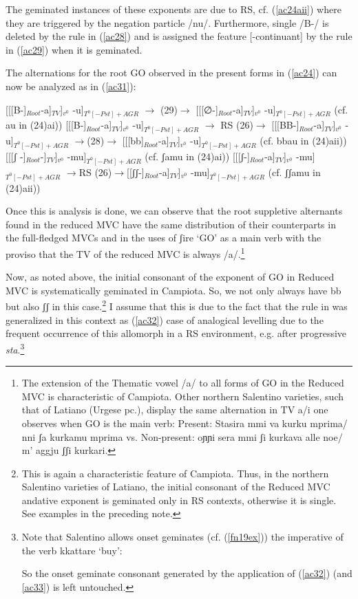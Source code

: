 \documentclass[output=paper]{langscibook}
\begin{document}
The geminated instances of these exponents are due to RS, cf. (\ref{ac24aii}) where they are triggered by the negation particle /nu/. Furthermore, single /B-/ is deleted by the rule in (\ref{ac28}) and is assigned the feature [-continuant] by the rule in (\ref{ac29}) when it is geminated.

The alternations for the root GO observed in the present forms in (\ref{ac24}) can now be analyzed as in (\ref{ac31}):

\ea\label{ac31}
    \ea \label{ac31a}{[[[B-]}$_{Root}$-a]$_{TV}$]$_{v^0}$ -u]$_{T^0 [-Pst]+AGR}$ $\rightarrow$ (29)$\rightarrow$ [[[∅-]$_{Root}$-a]$_{TV}$]$_{v^0}$ -u]$_{T^0 [-Pst]+AGR}$        (cf. au in (24)ai))
    \ex \label{ac31b}{[[[B-]}$_{Root}$-a]$_{TV}$]$_{v^0}$ -u]$_{T^0 [-Pst]+AGR}$ $\rightarrow$ RS (26)$\rightarrow$ [[[BB-]$_{Root}$-a]$_{TV}$]$_{v^0}$ -u]$_{T^0 [-Pst]+AGR}$      $\rightarrow$(28)$\rightarrow$ [[[bb]$_{Root}$-a]$_{TV}$]$_{v^0}$ -u]$_{T^0 [-Pst]+AGR}$   (cf. bbau in (24)aii)) 
    \ex \label{ac31c}{[[[ʃ -]}$_{Root}$-]$_{TV}$]$_{v^0}$ -mu]$_{T^0 [-Pst]+AGR}$ (cf. ʃamu in (24)ai))
    \ex \label{ac31d}{[[[ʃ-]}$_{Root}$-a]$_{TV}$]$_{v^0}$ -mu]$_{T^0 [-Pst]+AGR}$ $\rightarrow$RS (26)$\rightarrow$[[ʃʃ-]$_{Root}$-a]$_{TV}$]$_{v^0}$ -mu]$_{T^0 [-Pst]+AGR}$           (cf. ʃʃamu in (24)aii))
    \z
\z

Once this is analysis is done, we can observe that the root suppletive alternants found in the reduced MVC have the same distribution of their counterparts in the full-fledged MVCs and in the uses of  ʃire ‘GO’ as a main verb with the proviso that the TV of the reduced MVC is always /a/.\footnote{The extension of the Thematic vowel /a/ to all forms of GO in the Reduced MVC is characteristic of Campiota.  Other northern  Salentino varieties, such that of Latiano (Urgese pc.), display the same alternation in TV a/i one observes when GO is the main verb: Present: Stasira mmi va kurku mprima/ nni ʃa kurkamu mprima vs. Non-present: oɲɲi sera mmi ʃi kurkava alle noe/ m’ aggju ʃʃi kurkari.}

Now, as noted above, the initial consonant of the exponent of GO in Reduced MVC is systematically geminated in Campiota.  So, we not only always have bb but also ʃʃ in this case.\footnote{This is again a characteristic feature of Campiota.  Thus, in the northern Salentino varieties of Latiano, the initial consonant of the Reduced MVC andative exponent is geminated only in RS contexts, otherwise it is single.  See examples in the preceding note.} I assume that this is due to the fact that the rule in  was generalized in this context as (\ref{ac32}) case of analogical levelling due to the frequent occurrence of this allomorph in a RS environment, e.g. after progressive \textit{sta}.\footnote{Note that Salentino allows onset geminates (cf. (\ref{fn19ex})) the imperative of the verb kkattare ‘buy’:

\z

So the onset geminate consonant generated by the application of (\ref{ac32}) (and \ref{ac33}) is left untouched.
}
\end{document}
